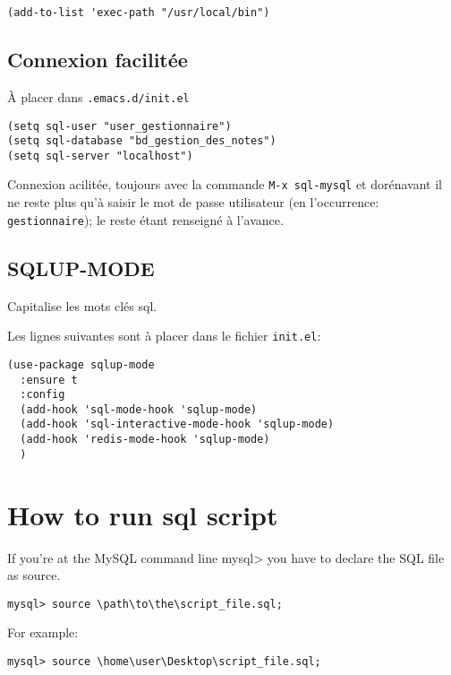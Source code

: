 \documentclass[11pt]{article}
\begin{document}
\begin{verbatim}
(add-to-list 'exec-path "/usr/local/bin")
\end{verbatim}

\subsection{Connexion facilitée}
\label{sec:orgeb50d99}
À placer dans \texttt{.emacs.d/init.el}
\begin{verbatim}
(setq sql-user "user_gestionnaire")
(setq sql-database "bd_gestion_des_notes")
(setq sql-server "localhost")
\end{verbatim}

Connexion acilitée, toujours avec la commande \texttt{M-x sql-mysql} et dorénavant il ne reste plus qu'à saisir le mot de passe utilisateur (en l'occurrence: \texttt{gestionnaire}); le reste étant renseigné à l'avance.

\subsection{SQLUP-MODE}
\label{sec:orga6d58c1}

Capitalise les mots clés sql.

Les lignes suivantes sont  à placer dans le fichier \texttt{init.el}:

\begin{verbatim}
(use-package sqlup-mode
  :ensure t
  :config
  (add-hook 'sql-mode-hook 'sqlup-mode)
  (add-hook 'sql-interactive-mode-hook 'sqlup-mode)
  (add-hook 'redis-mode-hook 'sqlup-mode)
  )
\end{verbatim}


\section{How to run sql script}
\label{sec:org9df9831}

If you’re at the MySQL command line mysql> you have to declare the SQL file as source.

\begin{verbatim}
mysql> source \path\to\the\script_file.sql;
\end{verbatim}

For example:

\begin{verbatim}
mysql> source \home\user\Desktop\script_file.sql;
\end{verbatim}
\end{document}
